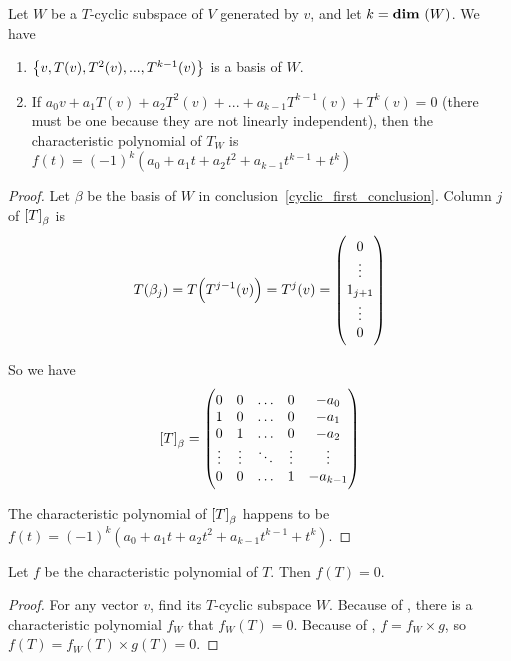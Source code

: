 \begin{theorem}\label{char_poly_of_invariant_subspace}
    Let $W$ be a $T$-cyclic subspace of $V$ generated by $v$, and let $k = \dimension{W}$. We have
    \begin{enumerate}
        \item $\set{v, T(v), T^2(v), ..., T^{k-1}(v)}$ is a basis of $W$\label{cyclic_first_conclusion}.
        \item If $a_0 v + a_1 T(v) + a_2 T^2(v) + ... + a_{k-1} T^{k-1} (v) + T^k (v) = 0$ (there must be one because they are not linearly independent), then the characteristic polynomial of $T_W$ is $f(t) = (-1)^k (a_0 + a_1 t + a_2 t^2 + a_{k-1} t^{k-1} + t^k)$
    \end{enumerate}
\end{theorem}
\begin{proof}
    Let $\beta$ be the basis of $W$ in conclusion~\ref{cyclic_first_conclusion}. Column $j$ of $\coordinate{T}_\beta$ is 
    \begin{equation*}
        T(\beta_j) = T\mleft(T^{j-1}(v)\mright) = T^{j}(v) = \begin{pmatrix}
            0 \\
            \vdots \\
            1_{j+1} \\
            \vdots \\
            0
        \end{pmatrix}
    \end{equation*}
    
    So we have 
    \begin{equation*}
        \coordinate{T}_\beta = \begin{pmatrix}
            0 & 0 & \hdots & 0 & -a_0 \\
            1 & 0 & \hdots & 0 & -a_1 \\
            0 & 1 & \hdots & 0 & -a_2 \\
            \vdots & \vdots & \ddots & \vdots & \vdots \\
            0 & 0 & \hdots & 1 & -a_{k-1}
        \end{pmatrix}
    \end{equation*}
    
    The characteristic polynomial of $\coordinate{T}_\beta$ happens to be $f(t) = (-1)^k (a_0 + a_1 t + a_2 t^2 + a_{k-1} t^{k-1} + t^k)$.
\end{proof}

\begin{theorem}
    Let $f$ be the characteristic polynomial of $T$. Then $f(T) = 0$.
\end{theorem}
\begin{proof}
    For any vector $v$, find its $T$-cyclic subspace $W$. Because of , there is a characteristic polynomial $f_W$ that $f_W(T) = 0$. Because of , $f = f_W \times g$, so $f(T) = f_W(T) \times g(T) = 0$.
\end{proof}



